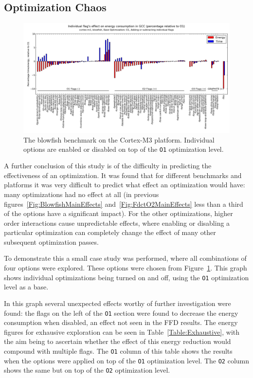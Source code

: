 \documentclass[twocolumn]{article}
\let\oldcaption\caption
\renewcommand{\caption}[1]{\oldcaption{\textup{#1}}}
\begin{document}

\subsection{Optimization Chaos}

\begin{figure}[bt]
	\includegraphics[width=\linewidth,clip,trim=0.5cm 0 0cm 1.8cm]{cortex-m3/O1_addsub_blowfish.png}
	\caption{The blowfish benchmark on the Cortex-M3 platform. Individual options are enabled or disabled on top of the \texttt{O1} optimization level.}
	\label{Fig:AddsubO1Blowfish}
\end{figure}

A further conclusion of this study is of the difficulty in predicting the effectiveness of an optimization. It was found that for different benchmarks and platforms it was very difficult to predict what effect an optimization would have: many optimizations had no effect at all (in previous figures~\ref{Fig:BlowfishMainEffects} and~\ref{Fig:FdctO2MainEffects} less than a third of the options have a significant impact). For the other optimizations, higher order interactions cause unpredictable effects, where enabling or disabling a particular optimization can completely change the effect of many other subsequent optimization passes.

To demonstrate this a small case study was performed, where all combinations of four options were explored. These options were chosen from Figure~\ref{Fig:AddsubO1Blowfish}. This graph shows individual optimizations being turned on and off, using the \texttt{O1} optimization level as a base.

In this graph several unexpected effects worthy of further investigation were found: the flags on the left of the \texttt{O1} section were found to decrease the energy consumption when disabled, an effect not seen in the FFD results. The energy figures for exhausive exploration can be seen in Table~\ref{Table:Exhaustive}, with the aim being to ascertain whether the effect of this energy reduction would compound with multiple flags. The \texttt{O1} column of this table shows the results when the options were applied on top of the \texttt{O1} optimization level. The \texttt{O2} column shows the same but on top of the \texttt{O2} optimization level.
\end{document}
